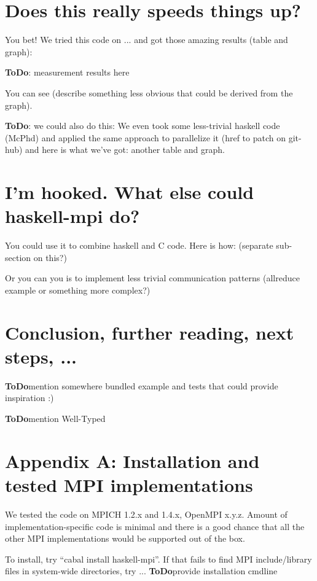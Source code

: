 \documentclass{tmr}
\newcommand{\ToDo}[1]{\textbf{ToDo}{#1}}
\begin{document}
\section{Does this really speeds things up?}

You bet! We tried this code on ... and got those amazing results (table and graph):

\ToDo: measurement results here

You can see (describe something less obvious that could be derived from the graph).

\ToDo: we could also do this: We even took some less-trivial haskell
code (McPhd) and applied the same approach to parallelize it (href to
patch on git-hub) and here is what we've got: another table and graph.

\section{I'm hooked. What else could haskell-mpi do?}

You could use it to combine haskell and C code. Here is how: (separate sub-section on this?)

Or you can you is to implement less trivial communication patterns (allreduce example or something more complex?)


\section{Conclusion, further reading, next steps, ...}

\ToDo mention somewhere bundled example and tests that could provide inspiration :)

\ToDo mention Well-Typed

\section{Appendix A: Installation and tested MPI implementations}
We tested the code on MPICH 1.2.x and 1.4.x, OpenMPI x.y.z. Amount of implementation-specific code is minimal and there is a good chance that all the other MPI implementations would be supported out of the box.

To install, try ``cabal install haskell-mpi''. If that fails to find MPI include/library files in system-wide directories, try ...
\ToDo provide installation cmdline
\end{document}
